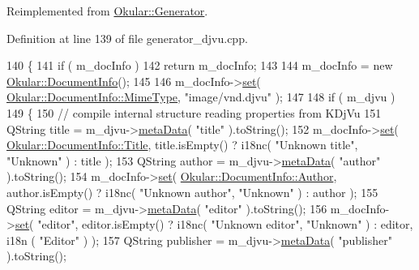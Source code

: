 Reimplemented from \hyperlink{classOkular_1_1Generator_a9993dd0a2415499e23d8394e7a447e98}{Okular\+::\+Generator}.



Definition at line 139 of file generator\+\_\+djvu.\+cpp.


\begin{DoxyCode}
140 \{
141     \textcolor{keywordflow}{if} ( m\_docInfo )
142         \textcolor{keywordflow}{return} m\_docInfo;
143 
144     m\_docInfo = \textcolor{keyword}{new} \hyperlink{classOkular_1_1DocumentInfo}{Okular::DocumentInfo}();
145 
146     m\_docInfo->\hyperlink{classOkular_1_1DocumentInfo_a8bd5403394ab192f1103cbf2a8e48d9b}{set}( \hyperlink{classOkular_1_1DocumentInfo_a3a6e5f7fb246e29bcb2e830b6f770791a786464e8e8c3e6ba1cd74e408487785b}{Okular::DocumentInfo::MimeType}, \textcolor{stringliteral}{"image/vnd.djvu"} );
147 
148     \textcolor{keywordflow}{if} ( m\_djvu )
149     \{
150         \textcolor{comment}{// compile internal structure reading properties from KDjVu}
151         QString title = m\_djvu->\hyperlink{classKDjVu_ae1a73203fc07dc0c81996810ca2f7ae3}{metaData}( \textcolor{stringliteral}{"title"} ).toString();
152         m\_docInfo->\hyperlink{classOkular_1_1DocumentInfo_a8bd5403394ab192f1103cbf2a8e48d9b}{set}( \hyperlink{classOkular_1_1DocumentInfo_a3a6e5f7fb246e29bcb2e830b6f770791ae400626d63f14b61c55bd22aca9481e0}{Okular::DocumentInfo::Title}, title.isEmpty() ? i18nc(
       \textcolor{stringliteral}{"Unknown title"}, \textcolor{stringliteral}{"Unknown"} ) : title );
153         QString author = m\_djvu->\hyperlink{classKDjVu_ae1a73203fc07dc0c81996810ca2f7ae3}{metaData}( \textcolor{stringliteral}{"author"} ).toString();
154         m\_docInfo->\hyperlink{classOkular_1_1DocumentInfo_a8bd5403394ab192f1103cbf2a8e48d9b}{set}( \hyperlink{classOkular_1_1DocumentInfo_a3a6e5f7fb246e29bcb2e830b6f770791a1010574d070b1925e030c20fef3e7a35}{Okular::DocumentInfo::Author}, author.isEmpty() ? 
      i18nc( \textcolor{stringliteral}{"Unknown author"}, \textcolor{stringliteral}{"Unknown"} ) : author );
155         QString editor = m\_djvu->\hyperlink{classKDjVu_ae1a73203fc07dc0c81996810ca2f7ae3}{metaData}( \textcolor{stringliteral}{"editor"} ).toString();
156         m\_docInfo->\hyperlink{classOkular_1_1DocumentInfo_a8bd5403394ab192f1103cbf2a8e48d9b}{set}( \textcolor{stringliteral}{"editor"}, editor.isEmpty() ? i18nc( \textcolor{stringliteral}{"Unknown editor"}, \textcolor{stringliteral}{"Unknown"} ) : editor, i18n
      ( \textcolor{stringliteral}{"Editor"} ) );
157         QString publisher = m\_djvu->\hyperlink{classKDjVu_ae1a73203fc07dc0c81996810ca2f7ae3}{metaData}( \textcolor{stringliteral}{"publisher"} ).toString();

\end{DoxyCode}
